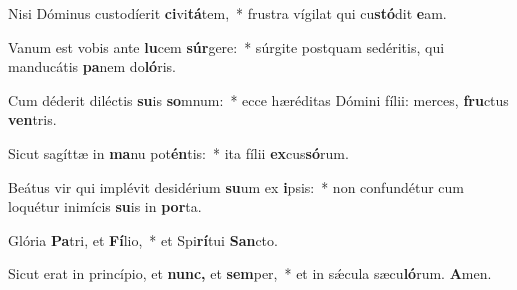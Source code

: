\item Nisi Dóminus custodíerit \textbf{ci}vi\textbf{tá}tem,~* frustra vígilat qui cu\textbf{stó}dit \textbf{e}am.
\item Vanum est vobis ante \textbf{lu}cem \textbf{súr}gere:~* súrgite postquam sedéritis, qui manducátis \textbf{pa}nem do\textbf{ló}ris.
\item Cum déderit diléctis \textbf{su}is \textbf{so}mnum:~* ecce hæréditas Dómini fílii: merces, \textbf{fru}ctus \textbf{ven}tris.
\item Sicut sagíttæ in \textbf{ma}nu pot\textbf{én}tis:~* ita fílii \textbf{ex}cus\textbf{só}rum.
\item Beátus vir qui implévit desidérium \textbf{su}um ex \textbf{i}psis:~* non confundétur cum loquétur inimícis \textbf{su}is in \textbf{por}ta.
\item Glória \textbf{Pa}tri, et \textbf{Fí}lio,~* et Spi\textbf{rí}tui \textbf{San}cto.
\item Sicut erat in princípio, et \textbf{nunc,} et \textbf{sem}per,~* et in sǽcula sæcu\textbf{ló}rum. \textbf{A}men.